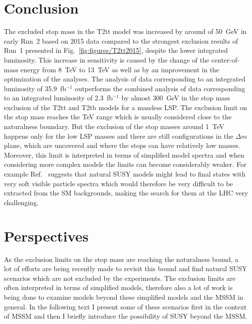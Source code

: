 \section{Conclusion}

The excluded stop mass in the T2tt model was increased by around of 50~GeV in early Run~2 based on 2015 data compared to the strongest exclusion results of Run~1 presented in Fig.~\ref{fig:figures/T2tt2015}, despite the lower integrated luminosity. This increase in sensitivity is caused by the change of the center-of-mass energy from 8~TeV to 13~TeV as well as by an improvement in the optimization of the analyses. The analysis of data corresponding to an integrated luminosity of 35.9~fb$^{-1}$ outperforms the combined analysis of data corresponding to an integrated luminosity of 2.3~fb$^{-1}$ by almost 300~GeV in the stop mass exclusion of the T2tt and T2tb models for a massless LSP. The exclusion limit on the stop mass reaches the TeV range which is usually considered close to the naturalness boundary. But the exclusion of the stop masses around 1~TeV happens only for the low LSP masses and there are still configurations in the $\Delta m$ plane, which are uncovered and where the stops can have relatively low masses. Moreover, this limit is interpreted in terms of simplified model spectra and when considering more complex models the limits can become considerably weaker. For example Ref.~\cite{Baer:2012uy} suggests that natural SUSY models might lead to final states with very soft visible particle spectra which would therefore be very difficult to be extracted from the SM backgrounds, making the search for them at the LHC very challenging.%


\newpage

\section{Perspectives}

As the exclusion limits on the stop mass are reaching the naturalness bound, a lot of efforts are being recently made to revisit this bound and find natural SUSY scenarios which are not excluded by the experiments. The exclusion limits are often interpreted in terms of simplified models, therefore also a lot of work is being done to examine models beyond these simplified models and the MSSM in general. In the following text I present some of these scenarios first in the context of MSSM and then I briefly introduce the possibility of SUSY beyond the MSSM.

